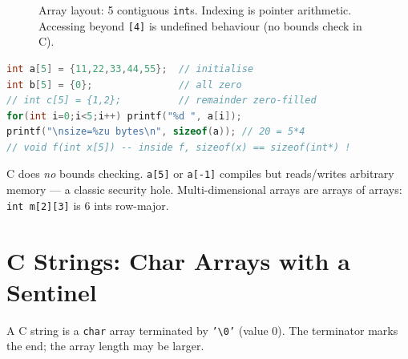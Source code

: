 \begin{figure}[h]\centering
{}
\caption{Array layout: 5 contiguous \texttt{int}s. Indexing is pointer arithmetic. Accessing beyond \texttt{[4]} is undefined behaviour (no bounds check in C).}
\label{fig:array-layout}
\end{figure}

\begin{lstlisting}[language=C]
int a[5] = {11,22,33,44,55};  // initialise
int b[5] = {0};               // all zero
// int c[5] = {1,2};          // remainder zero-filled
for(int i=0;i<5;i++) printf("%d ", a[i]);
printf("\nsize=%zu bytes\n", sizeof(a)); // 20 = 5*4
// void f(int x[5]) -- inside f, sizeof(x) == sizeof(int*) !
\end{lstlisting}
C does \emph{no} bounds checking. \texttt{a[5]} or \texttt{a[-1]} compiles but reads/writes arbitrary memory --- a classic security hole. Multi-dimensional arrays are arrays of arrays: \texttt{int m[2][3]} is 6 ints row-major.

\section{C Strings: Char Arrays with a Sentinel}
\label{sec:strings}
A C string is a \texttt{char} array terminated by \texttt{'\textbackslash0'} (value 0). The terminator marks the end; the array length may be larger.

